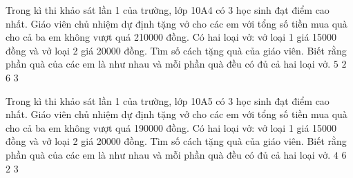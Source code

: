 \begin{ex}
 Trong kì thi khảo sát lần 1 của trường, lớp 10A4 có 3 học sinh đạt điểm cao nhất. Giáo viên chủ nhiệm dự định tặng vở cho các em với tổng số tiền mua quà cho cả ba em không vượt quá 210000 đồng. Có hai loại vở: vở loại 1 giá 15000 đồng và vở loại 2 giá 20000 đồng. Tìm số cách tặng quà của giáo viên. Biết rằng phần quà của các em là như nhau và mỗi phần quà đều có đủ cả hai loại vở.
\choice
{\True ${5}$}
{${2}$}
{${6}$}
{${3}$}
\end{ex}

\begin{ex}
 Trong kì thi khảo sát lần 1 của trường, lớp 10A5 có 3 học sinh đạt điểm cao nhất. Giáo viên chủ nhiệm dự định tặng vở cho các em với tổng số tiền mua quà cho cả ba em không vượt quá 190000 đồng. Có hai loại vở: vở loại 1 giá 15000 đồng và vở loại 2 giá 20000 đồng. Tìm số cách tặng quà của giáo viên. Biết rằng phần quà của các em là như nhau và mỗi phần quà đều có đủ cả hai loại vở.
\choice
{${4}$}
{${6}$}
{${2}$}
{\True ${3}$}
\end{ex}


